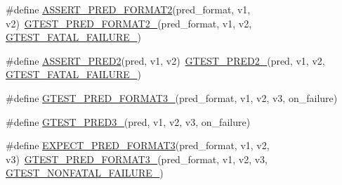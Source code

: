 \begin{DoxyCompactItemize}
\item 
\#define \mbox{\hyperlink{_obj__test_2lib_2googletest-master_2googletest_2include_2gtest_2gtest__pred__impl_8h_ac452685a1a98ea3d96eb956a062ee210}{A\+S\+S\+E\+R\+T\+\_\+\+P\+R\+E\+D\+\_\+\+F\+O\+R\+M\+A\+T2}}(pred\+\_\+format,  v1,  v2)~\mbox{\hyperlink{_obj__test_2lib_2googletest-release-1_88_81_2googletest_2include_2gtest_2gtest__pred__impl_8h_a115c18d1f752b7f091d577fb69cac372}{G\+T\+E\+S\+T\+\_\+\+P\+R\+E\+D\+\_\+\+F\+O\+R\+M\+A\+T2\+\_\+}}(pred\+\_\+format, v1, v2, \mbox{\hyperlink{_obj__test_2lib_2googletest-release-1_88_81_2googletest_2include_2gtest_2internal_2gtest-internal_8h_a0f9a4c3ea82cc7bf4478eaffdc168358}{G\+T\+E\+S\+T\+\_\+\+F\+A\+T\+A\+L\+\_\+\+F\+A\+I\+L\+U\+R\+E\+\_\+}})
\item 
\#define \mbox{\hyperlink{_obj__test_2lib_2googletest-master_2googletest_2include_2gtest_2gtest__pred__impl_8h_a4e9b777cce4e5423f4c2e491be7aa818}{A\+S\+S\+E\+R\+T\+\_\+\+P\+R\+E\+D2}}(pred,  v1,  v2)~\mbox{\hyperlink{_obj__test_2lib_2googletest-release-1_88_81_2googletest_2include_2gtest_2gtest__pred__impl_8h_ac560264104bd030b64034505d294a7b6}{G\+T\+E\+S\+T\+\_\+\+P\+R\+E\+D2\+\_\+}}(pred, v1, v2, \mbox{\hyperlink{_obj__test_2lib_2googletest-release-1_88_81_2googletest_2include_2gtest_2internal_2gtest-internal_8h_a0f9a4c3ea82cc7bf4478eaffdc168358}{G\+T\+E\+S\+T\+\_\+\+F\+A\+T\+A\+L\+\_\+\+F\+A\+I\+L\+U\+R\+E\+\_\+}})
\item 
\#define \mbox{\hyperlink{_obj__test_2lib_2googletest-master_2googletest_2include_2gtest_2gtest__pred__impl_8h_a49cdf8707268ee932bb772d879a226cc}{G\+T\+E\+S\+T\+\_\+\+P\+R\+E\+D\+\_\+\+F\+O\+R\+M\+A\+T3\+\_\+}}(pred\+\_\+format,  v1,  v2,  v3,  on\+\_\+failure)
\item 
\#define \mbox{\hyperlink{_obj__test_2lib_2googletest-master_2googletest_2include_2gtest_2gtest__pred__impl_8h_af30518f03233bc4486b55284b0827eb8}{G\+T\+E\+S\+T\+\_\+\+P\+R\+E\+D3\+\_\+}}(pred,  v1,  v2,  v3,  on\+\_\+failure)
\item 
\#define \mbox{\hyperlink{_obj__test_2lib_2googletest-master_2googletest_2include_2gtest_2gtest__pred__impl_8h_a7285708fa5d37d6d8ed5b5e59da08bae}{E\+X\+P\+E\+C\+T\+\_\+\+P\+R\+E\+D\+\_\+\+F\+O\+R\+M\+A\+T3}}(pred\+\_\+format,  v1,  v2,  v3)~\mbox{\hyperlink{_obj__test_2lib_2googletest-release-1_88_81_2googletest_2include_2gtest_2gtest__pred__impl_8h_a49cdf8707268ee932bb772d879a226cc}{G\+T\+E\+S\+T\+\_\+\+P\+R\+E\+D\+\_\+\+F\+O\+R\+M\+A\+T3\+\_\+}}(pred\+\_\+format, v1, v2, v3, \mbox{\hyperlink{_obj__test_2lib_2googletest-release-1_88_81_2googletest_2include_2gtest_2internal_2gtest-internal_8h_a6cb7482cfa03661a91c698eb5895f642}{G\+T\+E\+S\+T\+\_\+\+N\+O\+N\+F\+A\+T\+A\+L\+\_\+\+F\+A\+I\+L\+U\+R\+E\+\_\+}})

\end{DoxyCompactItemize}
